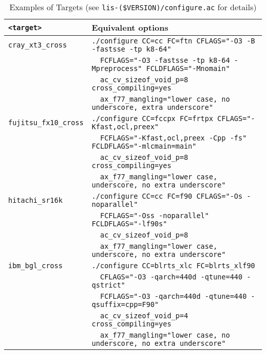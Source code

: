 \documentclass[a4paper]{article}
\begin{document}
\begin{table}[htbp]
\caption{Examples of Targets (see {\tt lis-(\$VERSION)/configure.ac} for details)}
\label{targetoption}
\begin{center}
\begin{tabular}{|l|l|}
\hline
\verb+<target>+           & Equivalent options \\ \hline
\verb+cray_xt3_cross+     & \verb+./configure CC=cc FC=ftn CFLAGS="-O3 -B -fastsse -tp k8-64"+ \\
                          & \verb+  FCFLAGS="-O3 -fastsse -tp k8-64 -Mpreprocess" FCLDFLAGS="-Mnomain"+\\
                          & \verb+  ac_cv_sizeof_void_p=8 cross_compiling=yes+\\
                          & \verb+  ax_f77_mangling="lower case, no underscore, extra underscore"+ \\ \hline
\verb+fujitsu_fx10_cross+ & \verb|./configure CC=fccpx FC=frtpx CFLAGS="-Kfast,ocl,preex"| \\
                          & \verb+  FCFLAGS="-Kfast,ocl,preex -Cpp -fs" FCLDFLAGS="-mlcmain=main"+\\
                          & \verb+  ac_cv_sizeof_void_p=8 cross_compiling=yes+\\
                          & \verb+  ax_f77_mangling="lower case, underscore, no extra underscore"+ \\ \hline
\verb+hitachi_sr16k+      & \verb|./configure CC=cc FC=f90 CFLAGS="-Os -noparallel"| \\
                          & \verb+  FCFLAGS="-Oss -noparallel" FCLDFLAGS="-lf90s"+ \\
                          & \verb+  ac_cv_sizeof_void_p=8+ \\
                          & \verb+  ax_f77_mangling="lower case, underscore, no extra underscore" + \\ \hline
\verb+ibm_bgl_cross+      & \verb+./configure CC=blrts_xlc FC=blrts_xlf90+ \\
                          & \verb+  CFLAGS="-O3 -qarch=440d -qtune=440 -qstrict"+ \\
                          & \verb+  FCFLAGS="-O3 -qarch=440d -qtune=440 -qsuffix=cpp=F90"+ \\
                          & \verb+  ac_cv_sizeof_void_p=4 cross_compiling=yes+\\
& \verb+  ax_f77_mangling="lower case, no underscore, no extra underscore"+ \\ \hline

\end{tabular}
\end{center}
\end{table}
\end{document}
